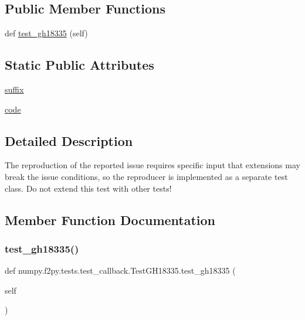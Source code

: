 \subsection*{Public Member Functions}
\begin{DoxyCompactItemize}
\item 
def \hyperlink{classnumpy_1_1f2py_1_1tests_1_1test__callback_1_1TestGH18335_a8ccb60c6d17221a2713ba4f7b45a719e}{test\+\_\+gh18335} (self)
\end{DoxyCompactItemize}
\subsection*{Static Public Attributes}
\begin{DoxyCompactItemize}
\item 
\hyperlink{classnumpy_1_1f2py_1_1tests_1_1test__callback_1_1TestGH18335_ad1a9c5d06cf5ad71efec71e92406d40f}{suffix}
\item 
\hyperlink{classnumpy_1_1f2py_1_1tests_1_1test__callback_1_1TestGH18335_ae8be07c4373807c7cf78d0ceab57bac0}{code}
\end{DoxyCompactItemize}


\subsection{Detailed Description}
\begin{DoxyVerb}The reproduction of the reported issue requires specific input that
extensions may break the issue conditions, so the reproducer is
implemented as a separate test class. Do not extend this test with
other tests!
\end{DoxyVerb}
 

\subsection{Member Function Documentation}
\mbox{\label{classnumpy_1_1f2py_1_1tests_1_1test__callback_1_1TestGH18335_a8ccb60c6d17221a2713ba4f7b45a719e}} 
\subsubsection{\texorpdfstring{test\+\_\+gh18335()}{test\_gh18335()}}
{\footnotesize\ttfamily def numpy.\+f2py.\+tests.\+test\+\_\+callback.\+Test\+G\+H18335.\+test\+\_\+gh18335 (\begin{DoxyParamCaption}\item[{}]{self }\end{DoxyParamCaption})}



